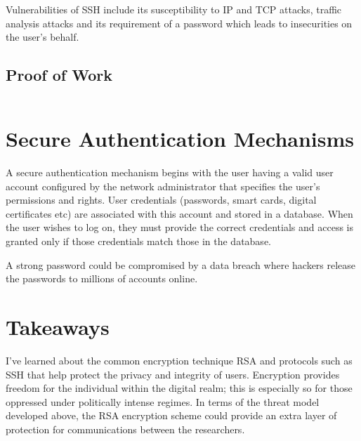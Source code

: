 \documentclass{article}
\begin{document}
    Vulnerabilities of SSH include its susceptibility to IP and TCP attacks, traffic analysis attacks and its requirement of a password which leads to insecurities on the user's behalf. 
    
    \subsection{Proof of Work}
        \inputminted[breaklines=true]{text}{logfile_ssh.txt}

\section{Secure Authentication Mechanisms}
    A secure authentication mechanism begins with the user having a valid user account configured by the network administrator that specifies the user's permissions and rights. User credentials (passwords, smart cards, digital certificates etc) are associated with this account and stored in a database. When the user wishes to log on, they must provide the correct credentials and access is granted only if those credentials match those in the database.
    
    A strong password could be compromised by a data breach where hackers release the passwords to millions of accounts online. 
    
\section{Takeaways}
    I've learned about the common encryption technique RSA and protocols such as SSH that help protect the privacy and integrity of users. Encryption provides freedom for the individual within the digital realm; this is especially so for those oppressed under politically intense regimes. In terms of the threat model developed above, the RSA encryption scheme could provide an extra layer of protection for communications between the researchers. 
    
\end{document}
